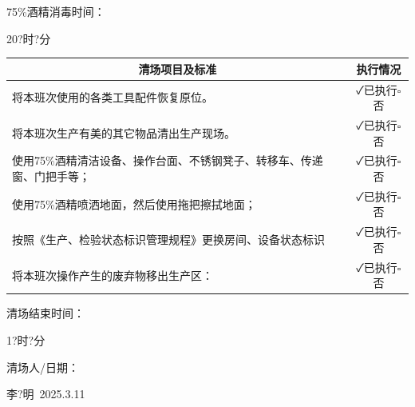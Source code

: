\documentclass[UTF8,10pt,a4paper,fontset=fandol]{ctexart}
\newcommand{\fieldvalue}[1]{#1}
\newcommand{\handwritten}[1]{#1}
\begin{document}
\hfill 75\%酒精消毒时间：

\fieldvalue{\handwritten{20?时?分}}

\medskip

\begin{tabularx}{\textwidth}{|X|c|}
\hline
\multicolumn{1}{|c|}{\textbf{清场项目及标准}} & \textbf{执行情况} \\
\hline
将本班次使用的各类工具配件恢复原位。 &
\fieldvalue{\handwritten{✓}}已执行\quad $\square$否 \\
\hline
将本班次生产有美的其它物品清出生产现场。 &
\fieldvalue{\handwritten{✓}}已执行\quad $\square$否 \\
\hline
使用75\%酒精清洁设备、操作台面、不锈钢凳子、转移车、传递窗、门把手等； &
\fieldvalue{\handwritten{✓}}已执行\quad $\square$否 \\
\hline
使用75\%酒精喷洒地面，然后使用拖把擦拭地面； &
\fieldvalue{\handwritten{✓}}已执行\quad $\square$否 \\
\hline
按照《生产、检验状态标识管理规程》更换房间、设备状态标识 &
\fieldvalue{\handwritten{✓}}已执行\quad $\square$否 \\
\hline
将本班次操作产生的废弃物移出生产区： &
\fieldvalue{\handwritten{✓}}已执行\quad $\square$否 \\
\hline
\end{tabularx}

\medskip

清场结束时间：

\fieldvalue{\handwritten{1?时?分}}

清场人/日期：

\fieldvalue{\handwritten{李?明\ 2025.3.11}}

\medskip
\end{document}
